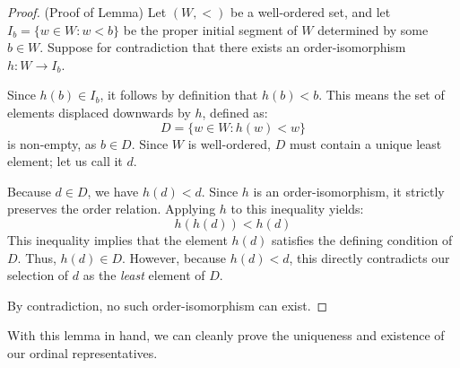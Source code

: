 \documentclass[11pt]{article}
\begin{document}
\begin{proof}(Proof of Lemma)
Let $(W,<)$ be a well-ordered set, and let $I_b = \{w \in W : w < b\}$ be the proper initial segment of $W$ determined by some $b \in W$. Suppose for contradiction that there exists an order-isomorphism $h: W \to I_b$.

Since $h(b) \in I_b$, it follows by definition that $h(b) < b$. This means the set of elements displaced downwards by $h$, defined as:
\[
D = \{w \in W : h(w) < w\}
\]
is non-empty, as $b \in D$. Since $W$ is well-ordered, $D$ must contain a unique least element; let us call it $d$.

Because $d \in D$, we have $h(d) < d$. Since $h$ is an order-isomorphism, it strictly preserves the order relation. Applying $h$ to this inequality yields:
\[
h(h(d)) < h(d)
\]
This inequality implies that the element $h(d)$ satisfies the defining condition of $D$. Thus, $h(d) \in D$. However, because $h(d) < d$, this directly contradicts our selection of $d$ as the \textit{least} element of $D$. 

By contradiction, no such order-isomorphism can exist.
\end{proof}

With this lemma in hand, we can cleanly prove the uniqueness and existence of our ordinal representatives.
\end{document}
